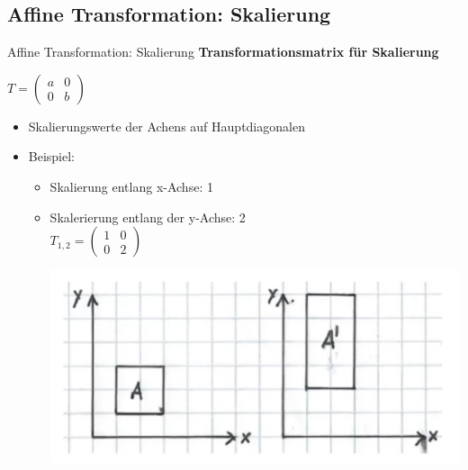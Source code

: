 \documentclass[10pt,aspectratio=169]{beamer}
\begin{document}
  \subsection{Affine Transformation: Skalierung}
  \begin{frame}{Affine Transformation: Skalierung}
    \textbf{Transformationsmatrix für Skalierung}
    \begin{center}
      $T = \begin{pmatrix}
        a & 0\\
        0 & b
      \end{pmatrix}$
      \begin{itemize}
        \item Skalierungswerte der Achens auf Hauptdiagonalen
        \item Beispiel:
        \begin{itemize}
          \item Skalierung entlang x-Achse: 1
          \item Skalerierung entlang der y-Achse: 2
            \\\vspace{0.1cm}
            $T_{1,2} = \begin{pmatrix}
              1 & 0\\
              0 & 2
            \end{pmatrix}
            $
          \begin{center}
            \includegraphics[scale=0.15]{skalierung}  
          \end{center}
          
          
        \end{itemize}
      \end{itemize}
    \end{center}
  \end{frame}
\end{document}

